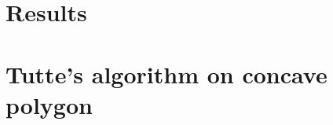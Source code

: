 \documentclass[12pt]{report}
\begin{document}
\chapter{Results}



\chapter{Tutte's algorithm on concave polygon}




\end{document}
